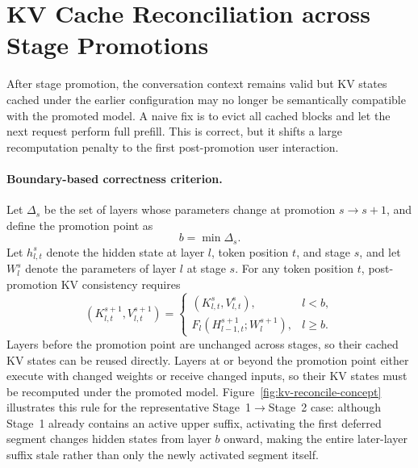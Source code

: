 \section{KV Cache Reconciliation across Stage Promotions}
\label{sec:kv_reconcile}

After stage promotion, the conversation context remains valid but KV states cached under the earlier configuration may no longer be semantically compatible with the promoted model. A naive fix is to evict all cached blocks and let the next request perform full prefill. This is correct, but it shifts a large recomputation penalty to the first post-promotion user interaction.

\paragraph{Boundary-based correctness criterion.}
Let $\Delta_s$ be the set of layers whose parameters change at promotion $s\!\rightarrow\!s{+}1$, and define the promotion point as
\begin{equation}
b = \min \Delta_s .
\end{equation}
Let $h^{s}_{l,t}$ denote the hidden state at layer $l$, token position $t$, and stage $s$, and let $W^{s}_l$ denote the parameters of layer $l$ at stage $s$. For any token position $t$, post-promotion KV consistency requires
\begin{equation}
(K^{s+1}_{l,t},V^{s+1}_{l,t}) =
\begin{cases}
(K^{s}_{l,t},V^{s}_{l,t}), & l < b,\\
F_l(H^{s+1}_{l-1,t}; W^{s+1}_l), & l \ge b.
\end{cases}
\label{eq:kv_boundary_rule}
\end{equation}
Layers before the promotion point are unchanged across stages, so their cached KV states can be reused directly. Layers at or beyond the promotion point either execute with changed weights or receive changed inputs, so their KV states must be recomputed under the promoted model. Figure~\ref{fig:kv-reconcile-concept} illustrates this rule for the representative Stage~1$\rightarrow$Stage~2 case: although Stage~1 already contains an active upper suffix, activating the first deferred segment changes hidden states from layer $b$ onward, making the entire later-layer suffix stale rather than only the newly activated segment itself.


